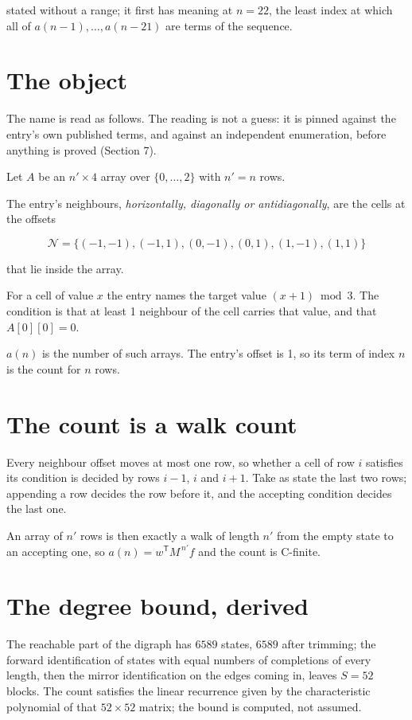 \documentclass[11pt]{article}
\theoremstyle{definition}
\begin{document}
stated without a range; it first has meaning at $n = 22$, the least index at which all of $a(n-1),\dots,a(n-21)$ are terms of the sequence.

\section{The object}

The name is read as follows. The reading is not a guess: it is pinned against the entry's own published terms, and against an independent enumeration, before anything is proved (Section 7).

Let $A$ be an $n' \times 4$ array over $\{0,\dots,2\}$ with $n' = n$ rows.

The entry's neighbours, {\itshape horizontally, diagonally or antidiagonally}, are the cells at the offsets

\[\mathcal{N} = \{(-1,-1), (-1,1), (0,-1), (0,1), (1,-1), (1,1)\}\]

that lie inside the array.

For a cell of value $x$ the entry names the target value $(x + 1) \bmod 3$. The condition is that at least 1 neighbour of the cell carries that value, and that $A[0][0] = 0$.

$a(n)$ is the number of such arrays. The entry's offset is 1, so its term of index $n$ is the count for $n$ rows.

\section{The count is a walk count}

Every neighbour offset moves at most one row, so whether a cell of row $i$ satisfies its condition is decided by rows $i-1$, $i$ and $i+1$. Take as state the last two rows; appending a row decides the row before it, and the accepting condition decides the last one.

An array of $n'$ rows is then exactly a walk of length $n'$ from the empty state to an accepting one, so $a(n) = w^{\mathsf T}M^{\,n'}f$ and the count is C-finite.

\section{The degree bound, derived}

The reachable part of the digraph has $6589$ states, $6589$ after trimming; the forward identification of states with equal numbers of completions of every length, then the mirror identification on the edges coming in, leaves $S = 52$ blocks. The count satisfies the linear recurrence given by the characteristic polynomial of that $52\times52$ matrix; the bound is computed, not assumed.
\end{document}
